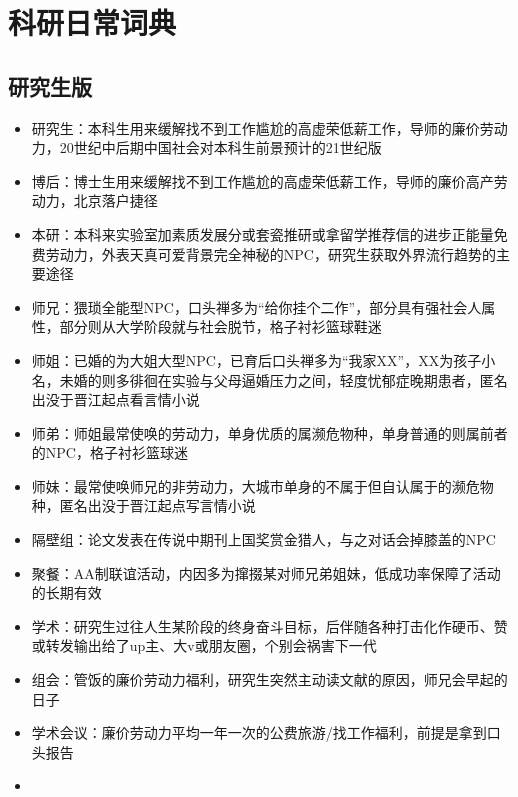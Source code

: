 \documentclass[]{tufte-book}
\providecommand{\tightlist}{%
  \setlength{\itemsep}{0pt}\setlength{\parskip}{0pt}}
\begin{document}
\hypertarget{ux79d1ux7814ux65e5ux5e38ux8bcdux5178}{%
\section*{科研日常词典}\label{ux79d1ux7814ux65e5ux5e38ux8bcdux5178}}

\hypertarget{ux7814ux7a76ux751fux7248}{%
\subsection*{研究生版}\label{ux7814ux7a76ux751fux7248}}

\begin{itemize}
\tightlist
\item
  研究生：本科生用来缓解找不到工作尴尬的高虚荣低薪工作，导师的廉价劳动力，20世纪中后期中国社会对本科生前景预计的21世纪版
\item
  博后：博士生用来缓解找不到工作尴尬的高虚荣低薪工作，导师的廉价高产劳动力，北京落户捷径
\item
  本研：本科来实验室加素质发展分或套瓷推研或拿留学推荐信的进步正能量免费劳动力，外表天真可爱背景完全神秘的NPC，研究生获取外界流行趋势的主要途径
\item
  师兄：猥琐全能型NPC，口头禅多为``给你挂个二作''，部分具有强社会人属性，部分则从大学阶段就与社会脱节，格子衬衫篮球鞋迷
\item
  师姐：已婚的为大姐大型NPC，已育后口头禅多为``我家XX''，XX为孩子小名，未婚的则多徘徊在实验与父母逼婚压力之间，轻度忧郁症晚期患者，匿名出没于晋江起点看言情小说
\item
  师弟：师姐最常使唤的劳动力，单身优质的属濒危物种，单身普通的则属前者的NPC，格子衬衫篮球迷
\item
  师妹：最常使唤师兄的非劳动力，大城市单身的不属于但自认属于的濒危物种，匿名出没于晋江起点写言情小说
\item
  隔壁组：论文发表在传说中期刊上国奖赏金猎人，与之对话会掉膝盖的NPC
\item
  聚餐：AA制联谊活动，内因多为撺掇某对师兄弟姐妹，低成功率保障了活动的长期有效
\item
  学术：研究生过往人生某阶段的终身奋斗目标，后伴随各种打击化作硬币、赞或转发输出给了up主、大v或朋友圈，个别会祸害下一代
\item
  组会：管饭的廉价劳动力福利，研究生突然主动读文献的原因，师兄会早起的日子
\item
  学术会议：廉价劳动力平均一年一次的公费旅游/找工作福利，前提是拿到口头报告
\item

\end{itemize}
\end{document}
